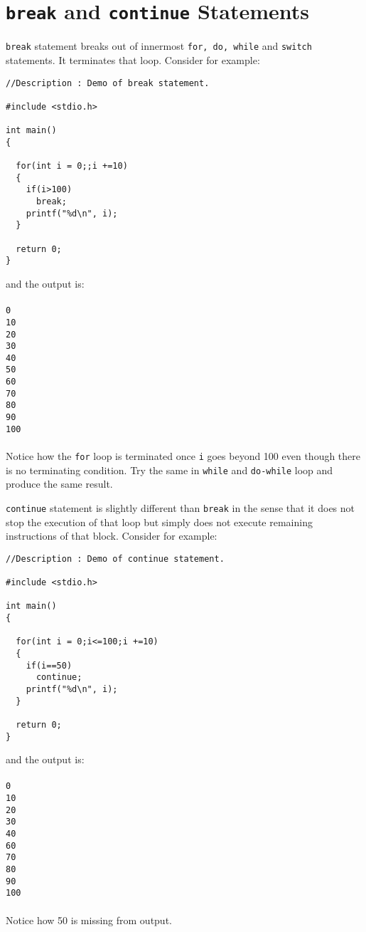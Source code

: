 \section{\texttt{break} and \texttt{continue} Statements}
\texttt{break} statement breaks out of innermost \texttt{for, do, while} and
\texttt{switch} statements. It terminates that loop. Consider for example:

\begin{verbatim}
//Description : Demo of break statement.

#include <stdio.h>

int main()
{

  for(int i = 0;;i +=10)
  {
    if(i>100)
      break;
    printf("%d\n", i);
  }

  return 0;
}
\end{verbatim}
and the output is:
\\\\\texttt{0\\
10\\
20\\
30\\
40\\
50\\
60\\
70\\
80\\
90\\
100\\\\}
Notice how the \texttt{for} loop is terminated once \texttt{i} goes beyond 100
even though there is no terminating condition. Try the same in \texttt{while}
and \texttt{do-while} loop and produce the same result.

\texttt{continue} statement is slightly different than \texttt{break} in the
sense that it does not stop the execution of that loop but simply does not
execute remaining instructions of that block. Consider for example:

\begin{verbatim}
//Description : Demo of continue statement.

#include <stdio.h>

int main()
{

  for(int i = 0;i<=100;i +=10)
  {
    if(i==50)
      continue;
    printf("%d\n", i);
  }

  return 0;
}
\end{verbatim}
and the output is:
\\\\\texttt{0\\
10\\
20\\
30\\
40\\
60\\
70\\
80\\
90\\
100\\\\}
Notice how 50 is missing from output.

